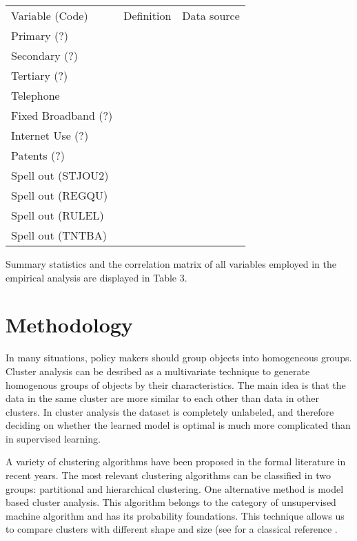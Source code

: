 \documentclass[11pt]{article}
\begin{document}
{\begin{table}[]
\begin{tabular}{lll}
Variable (Code)     & Definition & Data source \\
Primary (?)         &            &             \\
Secondary (?)       &            &             \\
Tertiary (?)        &            &             \\
Telephone           &            &             \\
Fixed Broadband (?) &            &             \\
Internet Use (?)    &            &             \\
Patents (?)         &            &             \\
Spell out (STJOU2)  &            &             \\
Spell out (REGQU)   &            &             \\
Spell out (RULEL)   &            &             \\
Spell out (TNTBA)   &            &            
\end{tabular}
\end{table}

 Summary statistics and the correlation matrix of all variables employed in the empirical analysis are displayed in Table 3.





\section{Methodology}

In many situations, policy makers should group objects into homogeneous groups. Cluster analysis can be desribed as a multivariate technique to generate homogenous groups of objects by their characteristics. The main idea is that the data in the same cluster are more similar to each other than data in other clusters.  In cluster analysis the dataset is completely unlabeled, and therefore deciding on whether the learned model is optimal is much more complicated than in supervised learning.  

\smallskip

A variety of clustering algorithms have been proposed in the formal literature in recent years.  The most relevant clustering algorithms can be classified in two groups: partitional and hierarchical clustering. One alternative method is model based cluster analysis. This algorithm belongs to the category of unsupervised machine algorithm and  has its probability foundations. This technique allows us to compare clusters with different shape and size (see for a classical reference \cite{Fraley02}.

}
\end{document}
